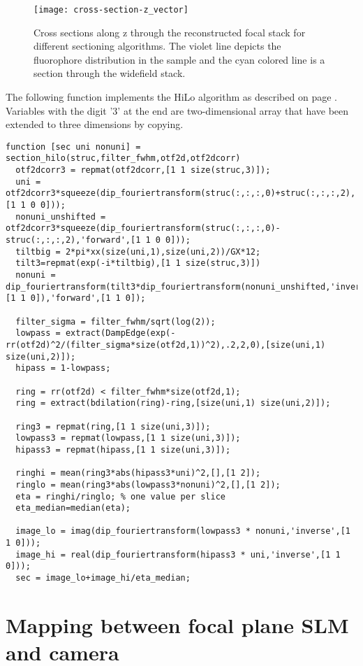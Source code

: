 \begin{figure}[htbp]
  \centering
  \texttt{[image: cross-section-z\_vector]}
  \caption{Cross sections along z through the reconstructed focal
    stack for different sectioning algorithms. The violet line depicts
    the fluorophore distribution in the sample and the cyan colored
    line is a section through the widefield stack.}
  \label{fig:cross-section-z}
\end{figure}
The following function implements the HiLo algorithm as described on
page \pageref{fig:hilo-method-description}. Variables with the digit '3'
at the end are two-dimensional array that have been extended to three
dimensions by copying.
\begin{lstlisting}[style=mymatlab]
function [sec uni nonuni] = section_hilo(struc,filter_fwhm,otf2d,otf2dcorr)
  otf2dcorr3 = repmat(otf2dcorr,[1 1 size(struc,3)]);
  uni = otf2dcorr3*squeeze(dip_fouriertransform(struc(:,:,:,0)+struc(:,:,:,2),'forward',[1 1 0 0]));
  nonuni_unshifted = otf2dcorr3*squeeze(dip_fouriertransform(struc(:,:,:,0)-struc(:,:,:,2),'forward',[1 1 0 0]));
  tiltbig = 2*pi*xx(size(uni,1),size(uni,2))/GX*12;
  tilt3=repmat(exp(-i*tiltbig),[1 1 size(struc,3)])
  nonuni = dip_fouriertransform(tilt3*dip_fouriertransform(nonuni_unshifted,'inverse',[1 1 0]),'forward',[1 1 0]);

  filter_sigma = filter_fwhm/sqrt(log(2));
  lowpass = extract(DampEdge(exp(-rr(otf2d)^2/(filter_sigma*size(otf2d,1))^2),.2,2,0),[size(uni,1) size(uni,2)]);
  hipass = 1-lowpass;

  ring = rr(otf2d) < filter_fwhm*size(otf2d,1);
  ring = extract(bdilation(ring)-ring,[size(uni,1) size(uni,2)]);

  ring3 = repmat(ring,[1 1 size(uni,3)]);
  lowpass3 = repmat(lowpass,[1 1 size(uni,3)]);
  hipass3 = repmat(hipass,[1 1 size(uni,3)]);

  ringhi = mean(ring3*abs(hipass3*uni)^2,[],[1 2]);
  ringlo = mean(ring3*abs(lowpass3*nonuni)^2,[],[1 2]);
  eta = ringhi/ringlo; % one value per slice
  eta_median=median(eta);
      
  image_lo = imag(dip_fouriertransform(lowpass3 * nonuni,'inverse',[1 1 0]));
  image_hi = real(dip_fouriertransform(hipass3 * uni,'inverse',[1 1 0]));
  sec = image_lo+image_hi/eta_median;
\end{lstlisting}
\chapter{Mapping between focal plane SLM and camera}
\label{sec:app_map}

